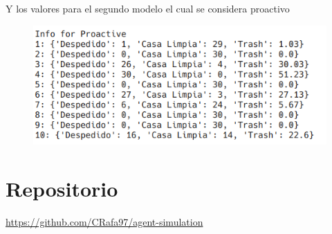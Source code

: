\documentclass[a4paper,10pt,twocolumn]{article}
\begin{document}
Y los valores para el segundo modelo el cual se considera proactivo

\begin{figure}[h]
	\includegraphics[scale=0.65]{./imgs/proactive}
\end{figure}

\section*{Repositorio}

\url{https://github.com/CRafa97/agent-simulation}

\begin{thebibliography}{9}
	
\end{thebibliography}

\label{end}
\end{document}
